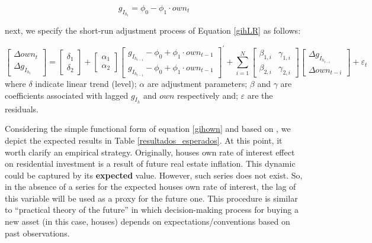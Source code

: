 \documentclass[12pt, a4paper]{article}
\begin{document}
\begin{latex}
\begin{equation}
\label{gihLR}
g_{I_{h_{t}}} = \phi_{0} - \phi_{1}\cdot own_{t}
\end{equation}
\end{latex}
next, we specify the short-run adjustment process of Equation \ref{gihLR} as follows:

\begin{equation}
\begin{bmatrix}
\Delta own_{t}\\
\Delta g_{I_{h_{t}}}
\end{bmatrix} = \begin{bmatrix}\delta_{1}\\ \delta_{2}\end{bmatrix} + \begin{bmatrix}\alpha_{1}\\ \alpha_{2}\end{bmatrix} \begin{bmatrix}g_{I_{h_{t-1}}} - \phi_{0} + \phi_{1}\cdot own_{t-1}\\g_{I_{h_{t-1}}} - \phi_{0} + \phi_{1}\cdot own_{t-1}\end{bmatrix}^{\prime} + \sum^N_{i=1} \begin{bmatrix}\beta_{1,i} & \gamma_{1,i} \\\beta_{2,i} & \gamma_{2,i} \end{bmatrix} \begin{bmatrix}\Delta g_{I_{h_{t-i}}} \\\Delta own_{t-i}\end{bmatrix} + \varepsilon_{t}
\end{equation}
where \(\delta\) indicate linear trend (level);
\(\alpha\) are adjustment parameters;
\(\beta\) and \(\gamma\) are coefficients associated with lagged \(g_{I_h}\) and \(own\) respectively and; \(\varepsilon\) are the residuals.

Considering the simple functional form of equation \ref{gihown} and based on \textcite{teixeira_crescimento_2015}, we depict the expected results in Table \ref{resultados_esperados}.
At this point, it worth clarify an empirical strategy.
Originally, houses own rate of interest effect on residential investment  is a result of future real estate inflation.
This dynamic could be captured by its \textbf{expected} value.
However, such series does not exist.
So, in the absence of a series for the expected houses own rate of interest, the lag of this variable will be used as a proxy for the future one.
This procedure is similar to \textcite{keynes_general_1937} ``practical theory of the future'' in which decision-making process for buying a new asset (in this case, houses) depends on expectations/conventions based on past observations.
\end{document}

